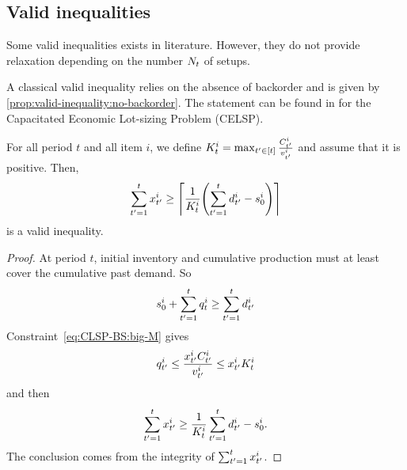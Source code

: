 


\subsection{Valid inequalities}
\label{sec:PDP:deterministic:theoretical-results:valid-inequality}

Some valid inequalities exists in literature.
However, they do not provide relaxation depending on the number $N_t$ of setups.

A classical valid inequality relies on the absence of backorder and is given by \cref{prop:valid-inequality:no-backorder}.
The statement can be found in \cite{Geunes2014} for the Capacitated Economic Lot-sizing Problem (CELSP).
\begin{prop}\label{prop:valid-inequality:no-backorder}
  For all period $t$ and all item $i$, we define $K_t^i = \max_{t'\in\range{t}}\frac{\capacity_{t'}^i}{\rate_{t'}^i}$ and assume that it is positive.
  Then,
  \begin{equation}\label{eq:valid-inequality:no-backorder}
    \sum_{t'=1}^{t}\setup_{t'}^i
    \ge
    \left\lceil
    \frac{1}{K_t^i} \bracket{ \sum_{t'=1}^{t}\demand_{t'}^i-\inventory_0^i }
    \right\rceil
  \end{equation}
  is a valid inequality.
\end{prop}


\begin{proof}
At period $t$, initial inventory and cumulative production must at least cover the cumulative past demand.
So
\begin{equation}
  s_0^i + \sum_{t'=1}^{t} q_t^i \ge \sum_{t'=1}^{t}d_{t'}^i
\end{equation}
Constraint~\eqref{eq:CLSP-BS:big-M} gives
\begin{equation}
  q_{t'}^i \le \frac{x_{t'}^iC_{t'}^i}{v_{t'}^i} \le x_{t'}^i K_t^i
\end{equation}
and then
\begin{equation}
  \sum_{t'=1}^tx_{t'}^i \ge \frac{1}{K_t^i}\sum_{t'=1}^td_{t'}^i-s_0^i.
\end{equation}
The conclusion comes from the integrity of $\sum_{t'=1}^tx_{t'}^i$.
\end{proof}

